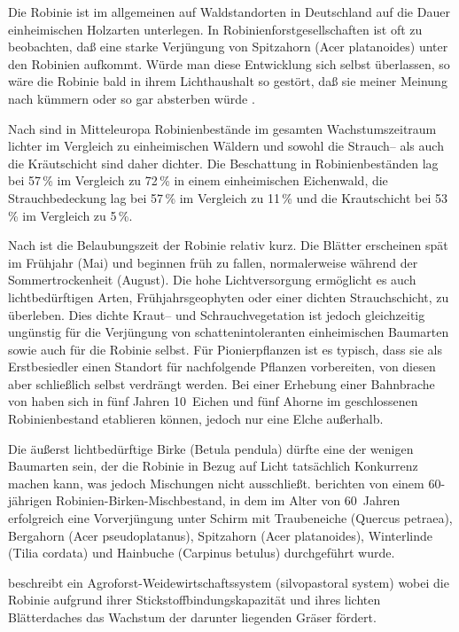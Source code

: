 \documentclass[twocolumn]{scrartcl}
\begin{document}
Die Robinie ist im allgemeinen auf Waldstandorten in Deutschland auf
die Dauer einheimischen Holzarten unterlegen. In
Robinienforstgesellschaften ist oft zu beobachten, daß eine starke
Verjüngung von Spitzahorn (Acer platanoides) unter den Robinien
aufkommt. Würde man diese Entwicklung sich selbst überlassen, so wäre
die Robinie bald in ihrem Lichthaushalt so gestört, daß sie meiner
Meinung nach kümmern oder so gar absterben würde
\citep{kohler1963robinie}.

Nach \citet{hanzelka2015robinie} sind in Mitteleuropa Robinienbestände
im gesamten Wachstumszeitraum lichter im Vergleich zu einheimischen
Wäldern und sowohl die Strauch-- als auch die Kräutschicht sind daher
dichter. Die Beschattung in Robinienbeständen lag bei 57\,\% im
Vergleich zu 72\,\% in einem einheimischen Eichenwald, die
Strauchbedeckung lag bei 57\,\% im Vergleich zu 11\,\% und die
Krautschicht bei 53\,\% im Vergleich zu 5\,\%.

Nach \citet{vitkova2017robinie} ist die Belaubungszeit der Robinie
relativ kurz. Die Blätter erscheinen spät im Frühjahr (Mai) und
beginnen früh zu fallen, normalerweise während der Sommertrockenheit
(August). Die hohe Lichtversorgung ermöglicht es auch lichtbedürftigen
Arten, Frühjahrsgeophyten oder einer dichten Strauchschicht, zu
überleben. Dies dichte Kraut-- und Schrauchvegetation ist jedoch
gleichzeitig ungünstig für die Verjüngung von schattenintoleranten
einheimischen Baumarten sowie auch für die Robinie selbst. Für
Pionierpflanzen ist es typisch, dass sie als Erstbesiedler einen
Standort für nachfolgende Pflanzen vorbereiten, von diesen aber
schließlich selbst verdrängt werden. Bei einer Erhebung einer
Bahnbrache von \citet{kowarik1996robinie} haben sich in fünf Jahren
10~Eichen und fünf Ahorne im geschlossenen Robinienbestand etablieren
können, jedoch nur eine Elche außerhalb.

Die äußerst lichtbedürftige Birke (Betula pendula) dürfte eine der
wenigen Baumarten sein, der die Robinie in Bezug auf Licht tatsächlich
Konkurrenz machen kann, was jedoch Mischungen nicht
ausschließt. \citet{gaier2009robinieVorverjuengung} berichten von
einem 60-jährigen Robinien-Birken-Mischbestand, in dem im Alter von
60~Jahren erfolgreich eine Vorverjüngung unter Schirm mit Traubeneiche
(Quercus petraea), Bergahorn (Acer pseudoplatanus), Spitzahorn (Acer
platanoides), Winterlinde (Tilia cordata) und Hainbuche (Carpinus
betulus) durchgeführt wurde.

\citet[p.\,467, 586]{ashton2018silviculture} beschreibt ein
Agroforst-Weidewirtschaftssystem (silvopastoral system) wobei die
Robinie aufgrund ihrer Stickstoffbindungskapazität und ihres lichten
Blätterdaches das Wachstum der darunter liegenden Gräser fördert.
\end{document}
